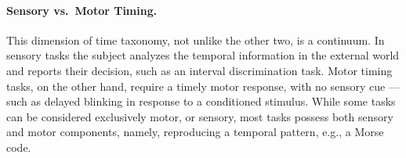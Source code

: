 \paragraph{Sensory vs.\ Motor Timing.} \label{ch:intro:taxonomy:SENvsMOT}
This dimension of time taxonomy, not unlike the other two, is a continuum.
In sensory tasks the subject analyzes the temporal information in the external world and reports their decision, such as an interval discrimination task.
Motor timing tasks, on the other hand, require a timely motor response, with no sensory cue --- such as delayed blinking in response to a conditioned stimulus.
While some tasks can be considered exclusively motor, or sensory, most tasks possess both sensory and motor components, namely, reproducing a temporal pattern, e.g., a Morse code.
